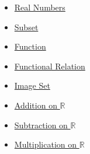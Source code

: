 \begin{dependencies}
\begin{itemize}
  \item \hyperref[def:reals]{Real Numbers}
  \item \hyperref[def:subset]{Subset}
  \item \hyperref[def:function]{Function}
  \item \hyperref[def:functional-relation]{Functional Relation}
  \item \hyperref[def:image-set]{Image Set}
  \item \hyperref[def:addition-on-r]{Addition on $\mathbb{R}$}
  \item \hyperref[def:subtraction-on-r]{Subtraction on $\mathbb{R}$}
  \item \hyperref[def:multiplication-on-r]{Multiplication on $\mathbb{R}$}
\end{itemize}
\end{dependencies}

